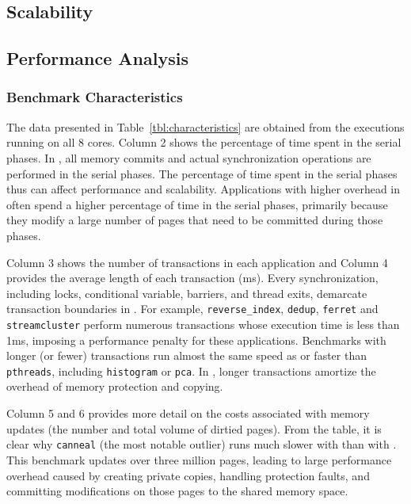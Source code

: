 \subsection{Scalability}



\subsection{Performance Analysis}

\subsubsection{Benchmark Characteristics}

The data presented in Table~\ref{tbl:characteristics} are obtained from the executions running on all 8 cores.  Column 2 shows the percentage of time spent in the serial phases.  In \dthreads{}, all memory commits and actual synchronization operations are performed in the serial phases.  The percentage of time spent in the serial phases thus can affect performance and scalability. Applications with higher overhead in \dthreads{} often spend a higher percentage of time in the
serial phases, primarily because they modify a large number of pages that need to be committed during those phases.

Column 3 shows the number of transactions in each application and Column 4 provides the average length of each transaction (ms).  Every synchronization, including locks, conditional variable, barriers, and thread exits, demarcate transaction boundaries in \dthreads{}.  For example, \texttt{reverse\_index}, \texttt{dedup}, \texttt{ferret}
and \texttt{streamcluster} perform numerous transactions whose
execution time is less than 1ms, imposing a performance penalty for these applications.  Benchmarks with longer (or fewer) transactions run almost the same speed as or faster than \texttt{pthreads}, including \texttt{histogram} or \texttt{pca}.  In \dthreads{}, longer transactions amortize the overhead of memory protection and copying.

Column 5 and 6 provides more detail on the costs associated with memory updates (the number and total volume of dirtied pages). From the table, it is clear why \texttt{canneal} (the most notable outlier) runs much slower with \dthreads{} than with \pthreads{}. This benchmark updates over three million pages, leading to large performance overhead caused by creating  private copies, handling protection faults, and committing modifications on those pages to the shared memory space. 

